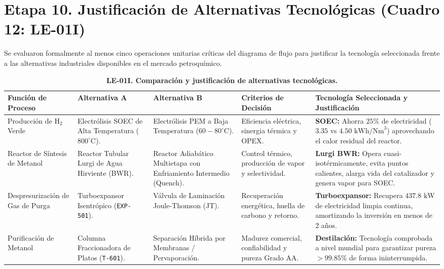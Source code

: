 \documentclass[10pt,letterpaper]{article}
\begin{document}
\section{Etapa 10. Justificación de Alternativas Tecnológicas (Cuadro 12: LE-01I)}

Se evaluaron formalmente al menos cinco operaciones unitarias críticas del diagrama de flujo para justificar la tecnología seleccionada frente a las alternativas industriales disponibles en el mercado petroquímico.

\begin{table}[H]
\centering
\small
\setlength{\tabcolsep}{3.5pt}
\caption{\textbf{LE-01I. Comparación y justificación de alternativas tecnológicas.}} \label{tab:cuadro12}
\begin{tabularx}{\textwidth}{>{\raggedright\arraybackslash}p{2.35cm} >{\raggedright\arraybackslash}p{2.45cm} >{\raggedright\arraybackslash}p{2.45cm} >{\raggedright\arraybackslash}p{2.15cm} X}
\toprule
\textbf{Función de Proceso} & \textbf{Alternativa A} & \textbf{Alternativa B} & \textbf{Criterios de Decisión} & \textbf{Tecnología Seleccionada y Justificación} \\
\midrule
Producción de $\text{H}_2$ Verde & Electrólisis SOEC de Alta Temperatura ($800^\circ\text{C}$). & Electrólisis PEM a Baja Temperatura ($60-80^\circ\text{C}$). & Eficiencia eléctrica, sinergia térmica y OPEX. & \textbf{SOEC:} Ahorra $25\%$ de electricidad ($3.35$ vs $4.50\text{ kWh/Nm}^3$) aprovechando el calor residual del reactor. \\
Reactor de Síntesis de Metanol & Reactor Tubular Lurgi de Agua Hirviente (BWR). & Reactor Adiabático Multietapa con Enfriamiento Intermedio (Quench). & Control térmico, producción de vapor y selectividad. & \textbf{Lurgi BWR:} Opera cuasi-isotérmicamente, evita puntos calientes, alarga vida del catalizador y genera vapor para SOEC. \\
Des\-pre\-su\-ri\-za\-ción de Gas de Purga & Turboexpansor Isentrópico (\texttt{EXP-501}). & Válvula de Laminación Joule-Thomson (JT). & Recuperación energética, huella de carbono y retorno. & \textbf{Turboexpansor:} Recupera $437.8\text{ kW}$ de electricidad limpia continua, amortizando la inversión en menos de 2 años. \\
Purificación de Metanol & Columna Fraccionadora de Platos (\texttt{T-601}). & Separación Híbrida por Membranas / Pervaporación. & Madurez comercial, confiabilidad y pureza Grado AA. & \textbf{Destilación:} Tecnología comprobada a nivel mundial para garantizar pureza $>99.85\%$ de forma ininterrumpida. \\

\end{tabularx}
\end{table}
\end{document}
